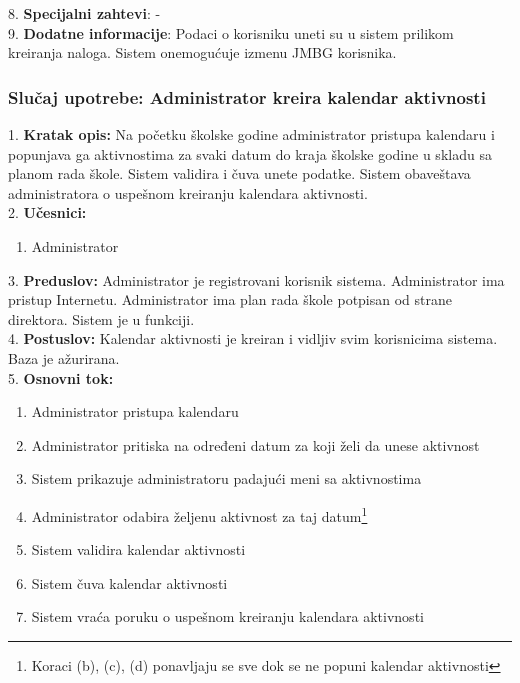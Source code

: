 \documentclass{article}
\begin{document}
8. \textbf{Specijalni zahtevi}: - \\

9. \textbf{Dodatne informacije}: Podaci o korisniku uneti su u sistem prilikom kreiranja naloga. Sistem onemogućuje izmenu JMBG korisnika. \\

\subsubsection{Slučaj upotrebe: Administrator kreira kalendar aktivnosti}
1. \textbf{Kratak opis:} Na početku školske godine administrator pristupa kalendaru i popunjava ga aktivnostima za svaki datum do kraja školske godine u skladu sa planom rada škole. Sistem validira i čuva unete podatke. Sistem obaveštava administratora o uspešnom kreiranju kalendara aktivnosti. \\ 

2. \textbf{Učesnici:}
\begin{enumerate} [label=(\alph*)]
\item Administrator
\end{enumerate} 

3. \textbf{Preduslov:} Administrator je registrovani korisnik sistema. Administrator ima pristup Internetu. Administrator ima plan rada škole potpisan od strane direktora. Sistem je u funkciji. \\

4. \textbf{Postuslov:} Kalendar aktivnosti je kreiran i vidljiv svim korisnicima sistema. Baza je ažurirana. \\

5. \textbf{Osnovni tok:} 
\begin{enumerate} [label=(\alph*)]
\item Administrator pristupa kalendaru
\item Administrator pritiska na određeni datum za koji želi da unese aktivnost
\item Sistem prikazuje administratoru padajući meni sa aktivnostima
\item Administrator odabira željenu aktivnost za taj datum\footnote{Koraci (b), (c), (d) ponavljaju se sve dok se ne popuni kalendar aktivnosti}
\item Sistem validira kalendar aktivnosti
\item Sistem čuva kalendar aktivnosti
\item Sistem vraća poruku o uspešnom kreiranju kalendara aktivnosti
\end{enumerate}
\end{document}
